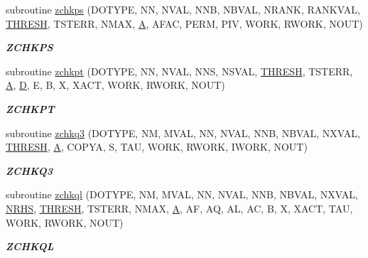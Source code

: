 \begin{DoxyCompactItemize}
subroutine \hyperlink{group__complex16__lin_ga0d8f1484cb381a6248ce3ea09def8c47}{zchkps} (D\+O\+T\+Y\+P\+E, N\+N, N\+V\+A\+L, N\+N\+B, N\+B\+V\+A\+L, N\+R\+A\+N\+K, R\+A\+N\+K\+V\+A\+L, \hyperlink{zlaqgs_8c_a0656018abfc9fa2821827415f5d5ea57}{T\+H\+R\+E\+S\+H}, T\+S\+T\+E\+R\+R, N\+M\+A\+X, \hyperlink{classA}{A}, A\+F\+A\+C, P\+E\+R\+M, P\+I\+V, W\+O\+R\+K, R\+W\+O\+R\+K, N\+O\+U\+T)
\begin{DoxyCompactList}\small\item\em {\bfseries Z\+C\+H\+K\+P\+S} \end{DoxyCompactList}\item 
subroutine \hyperlink{group__complex16__lin_gabba6ffddf11e3cc75d4e6466834dfc2b}{zchkpt} (D\+O\+T\+Y\+P\+E, N\+N, N\+V\+A\+L, N\+N\+S, N\+S\+V\+A\+L, \hyperlink{zlaqgs_8c_a0656018abfc9fa2821827415f5d5ea57}{T\+H\+R\+E\+S\+H}, T\+S\+T\+E\+R\+R, \hyperlink{classA}{A}, \hyperlink{odrpack_8h_a7dae6ea403d00f3687f24a874e67d139}{D}, E, B, X, X\+A\+C\+T, W\+O\+R\+K, R\+W\+O\+R\+K, N\+O\+U\+T)
\begin{DoxyCompactList}\small\item\em {\bfseries Z\+C\+H\+K\+P\+T} \end{DoxyCompactList}\item 
subroutine \hyperlink{group__complex16__lin_gae0d3a567435651e197d98c09d23920fc}{zchkq3} (D\+O\+T\+Y\+P\+E, N\+M, M\+V\+A\+L, N\+N, N\+V\+A\+L, N\+N\+B, N\+B\+V\+A\+L, N\+X\+V\+A\+L, \hyperlink{zlaqgs_8c_a0656018abfc9fa2821827415f5d5ea57}{T\+H\+R\+E\+S\+H}, \hyperlink{classA}{A}, C\+O\+P\+Y\+A, S, T\+A\+U, W\+O\+R\+K, R\+W\+O\+R\+K, I\+W\+O\+R\+K, N\+O\+U\+T)
\begin{DoxyCompactList}\small\item\em {\bfseries Z\+C\+H\+K\+Q3} \end{DoxyCompactList}\item 
subroutine \hyperlink{group__complex16__lin_ga32222e6b141ed4dead7eb2955de004b6}{zchkql} (D\+O\+T\+Y\+P\+E, N\+M, M\+V\+A\+L, N\+N, N\+V\+A\+L, N\+N\+B, N\+B\+V\+A\+L, N\+X\+V\+A\+L, \hyperlink{example__user_8c_aa0138da002ce2a90360df2f521eb3198}{N\+R\+H\+S}, \hyperlink{zlaqgs_8c_a0656018abfc9fa2821827415f5d5ea57}{T\+H\+R\+E\+S\+H}, T\+S\+T\+E\+R\+R, N\+M\+A\+X, \hyperlink{classA}{A}, A\+F, A\+Q, A\+L, A\+C, B, X, X\+A\+C\+T, T\+A\+U, W\+O\+R\+K, R\+W\+O\+R\+K, N\+O\+U\+T)
\begin{DoxyCompactList}\small\item\em {\bfseries Z\+C\+H\+K\+Q\+L} \end{DoxyCompactList}\item 

\end{DoxyCompactItemize}
